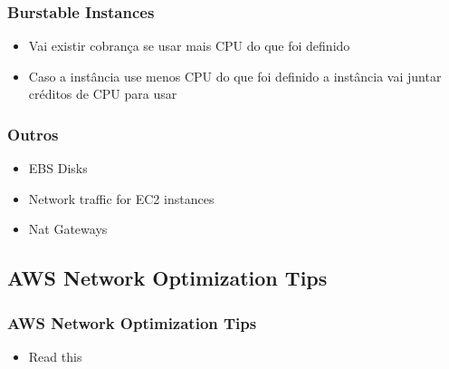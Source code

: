 \begin{frame}
	\frametitle{Burstable Instances}
	\begin{itemize}
		\item Vai existir cobrança se usar mais CPU do que foi definido
		\item Caso a instância use menos CPU do que foi definido a instância vai juntar créditos de CPU para usar
	\end{itemize}
\end{frame}

\begin{frame}
	\frametitle{Outros}
	\begin{itemize}
		\item EBS Disks
		\item Network traffic for EC2 instances
		\item Nat Gateways
	\end{itemize}
\end{frame}

\subsection{AWS Network Optimization Tips}

\begin{frame}
	\frametitle{AWS Network Optimization Tips}
	\begin{itemize}
		\item Read this \cite{AWSNOTips}
	\end{itemize}
\end{frame}
